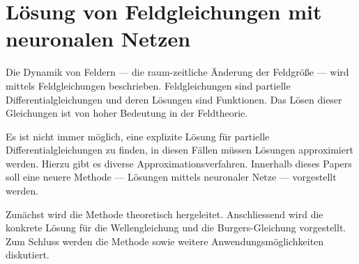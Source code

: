 %
%
%
%
\chapter{Lösung von Feldgleichungen mit neuronalen Netzen\label{chapter:neuronal}}
\begin{refsection}
%
%
%
%

\noindent
Die Dynamik von Feldern --- die raum-zeitliche Änderung der Feldgröße --- wird mittels Feldgleichungen beschrieben.
%
Feldgleichungen sind partielle Differentialgleichungen und deren Lösungen sind Funktionen.
Das Lösen dieser Gleichungen ist von hoher Bedeutung in der Feldtheorie.

Es ist nicht immer möglich, eine explizite Lösung für partielle Differentialgleichungen zu finden, in diesen Fällen müssen Lösungen approximiert werden.
Hierzu gibt es diverse Approximationsverfahren.
Innerhalb dieses Papers soll eine neuere Methode --- Lösungen mittels neuronaler Netze --- vorgestellt werden.
%

Zunächst wird die Methode theoretisch hergeleitet.
Anschliessend wird die konkrete Lösung für die Wellengleichung und die Burgers-Gleichung vorgestellt.
%
Zum Schluss werden die Methode sowie weitere Anwendungsmöglichkeiten diskutiert.






\printbibliography[heading=subbibliography]
\end{refsection}
